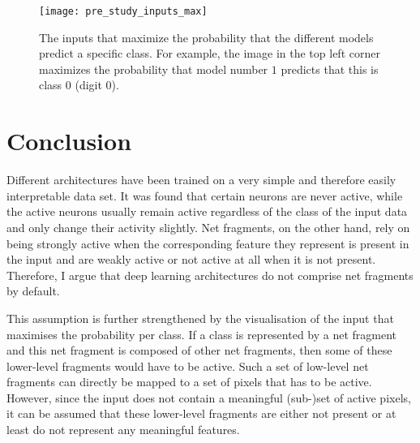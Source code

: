 \begin{figure}[h]
    \centering
    \texttt{[image: pre\_study\_inputs\_max]}
    \caption[Inputs that Maximize the Class Output Probability]{The inputs that maximize the probability that the different models predict a specific class. For example, the image in the top left corner maximizes the probability that model number $1$ predicts that this is class $0$ (digit $0$).}
\end{figure}


\section{Conclusion}
Different architectures have been trained on a very simple and therefore easily interpretable data set.
It was found that certain neurons are never active, while the active neurons usually remain active regardless of the class of the input data and only change their activity slightly.
Net fragments, on the other hand, rely on being strongly active when the corresponding feature they represent is present in the input and are weakly active or not active at all when it is not present.
Therefore, I argue that deep learning architectures do not comprise net fragments by default.

This assumption is further strengthened by the visualisation of the input that maximises the probability per class.
If a class is represented by a net fragment and this net fragment is composed of other net fragments, then some of these lower-level fragments would have to be active.
Such a set of low-level net fragments can directly be mapped to a set of pixels that has to be active.
However, since the input does not contain a meaningful (sub-)set of active pixels, it can be assumed that these lower-level fragments are either not present or at least do not represent any meaningful features.


